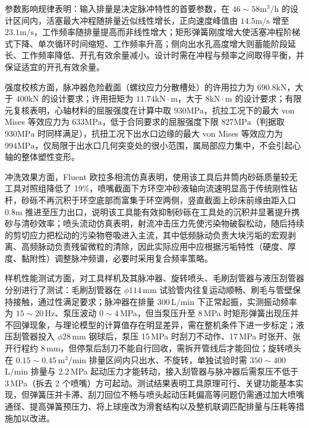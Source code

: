 参数影响规律表明：输入排量是决定脉冲特性的首要参数，在 $46\sim58\mathrm{m^3/h}$ 的设计区间内，活塞最大冲程随排量近似线性增长，正向速度峰值由 $14.5\mathrm{m/s}$ 增至 $23.1\mathrm{m/s}$，工作频率随排量提高而非线性增大；矩形弹簧刚度增大使活塞冲程阶梯式下降、单次循环时间缩短、工作频率升高；侧向出水孔高度增大则蓄能阶段延长、工作频率降低、开孔有效余量减小。设计时需在冲程与频率之间取得平衡，并保证适宜的开孔有效余量。

强度校核方面，脉冲器危险截面（螺纹应力分散槽处）的许用拉力为 $690.8\mathrm{kN}$，大于 $400\mathrm{kN}$ 的设计要求；许用扭矩为 $11.74\mathrm{kN\cdot m}$，大于 $8\mathrm{kN\cdot m}$ 的设计要求；有限元复核表明，心轴材料的屈服强度在计算中取 $930\mathrm{MPa}$，抗拉工况下的最大 von Mises 等效应力为 $633\mathrm{MPa}$，低于合同要求的屈服强度下限 $827\mathrm{MPa}$（判据取 $930\mathrm{MPa}$ 时同样满足），抗扭工况下出水口边缘的最大 von Mises 等效应力为 $994\mathrm{MPa}$，仅局限于出水口几何突变处的很小范围，属局部应力集中，不会引起心轴的整体塑性变形。
	
冲洗效果方面，Fluent 欧拉多相流仿真表明，使用该工具后井筒内砂砾质量较无工具对照组降低了 19\%，喷嘴截面下方环空冲砂液轴向流速明显高于传统刚性钻杆，砂砾不再沉积于环空底部而富集于环空两侧，竖直截面上砂床前缘由距入口 $0.8\mathrm{m}$ 推进至压力出口，说明该工具能有效抑制砂砾在工具处的沉积并显著提升携砂与清砂效率；喷头流动仿真表明，射流冲击压力先使污染物破裂松动，随后持续的剪切应力把松动的污染物卷吸进入主流，其中低频脉动负责大块污垢的宏观剥离、高频脉动负责残留微粒的清除，因此实际应用中应根据污垢特性（硬度、厚度、黏附性）调整脉冲频谱，必要时采用复合频率策略。

样机性能测试方面，对工具样机及其脉冲器、旋转喷头、毛刷刮管器与液压刮管器分别进行了测试：毛刷刮管器在 $\phi 114$\,mm 试验管内往复运动顺畅、刷毛与管壁保持接触，通过性满足要求；脉冲器在排量 300\,L/min 下正常起振，实测振动频率为 $15\sim20$\,Hz、泵压波动 $0\sim4$\,MPa，但当泵压升至 8\,MPa 时矩形弹簧出现压并不回弹现象，与理论模型的计算值存在明显差异，需在整机条件下进一步标定；液压刮管器投入 $\phi 28$\,mm 钢球后，泵压 15\,MPa 时刮刀不动作、17\,MPa 时张开、张开行程约 8\,mm，但停泵后刮刀不能自行回收，需拆开管线后才能回位；旋转喷头在 $0.15\sim0.45$\,m$^3$/min 排量区间内只出水、不旋转，单独试验时需 $350\sim400$\,L/min 排量与 2.2\,MPa 起动压力才能转动，接入刮管器与脉冲器后需泵压不低于 3\,MPa（拆去 2 个喷嘴）方可起动。测试结果表明工具原理可行、关键功能基本实现，但弹簧压并卡滞、刮刀回位不畅与喷头起动压耗偏高等问题仍需通过加大喷嘴通径、提高弹簧预压力、将上球座改为滑套结构以及整机联调匹配排量与压耗等措施加以改进。


